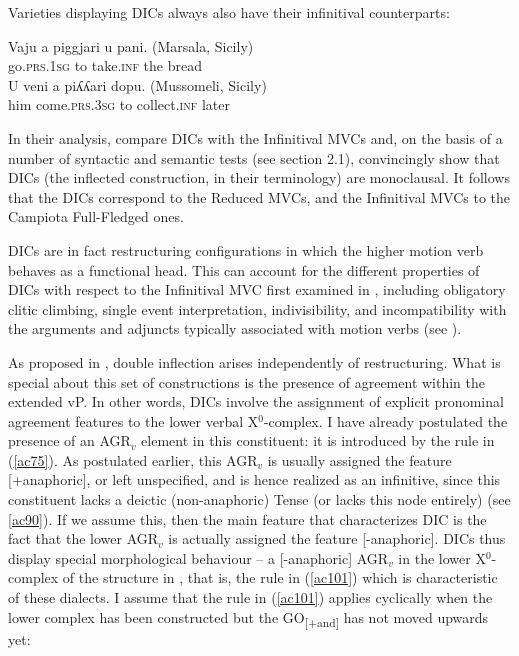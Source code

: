 \documentclass[output=paper]{langscibook}
\begin{document}
Varieties displaying DICs always also have their infinitival counterparts:

\ea \label{ac99}\gll Vaju    a  piggjari u     pani.    (Marsala, Sicily)\\
go.\textsc{prs}.\textsc{1sg} to  take.\textsc{inf} the    bread \\
\ex \label{ac100}\gll U   veni      a   piʎʎari   dopu.   (Mussomeli, Sicily)\\
him  come.\textsc{prs}.\textsc{3sg} to   collect.\textsc{inf} later\\
\z

In their analysis, \cite{cardinaletti2001a} compare DICs with the Infinitival MVCs and, on the basis of a number of syntactic and semantic tests (see section 2.1), convincingly show that DICs (the inflected construction, in their terminology) are monoclausal. It follows that the DICs correspond to the Reduced MVCs, and the Infinitival MVCs to the Campiota Full-Fledged ones.

DICs are in fact restructuring configurations in which the higher motion verb behaves as a functional head. This can account for the different properties of DICs with respect to the Infinitival MVC first examined in \cite{cardinaletti2001a}, including obligatory clitic climbing, single event interpretation, indivisibility, and incompatibility with the arguments and adjuncts typically associated with motion verbs (see \cite{cardinaletti2001a, cardinaletti2003a, manzini2005a, cruschina2013a, caro2019a}). 

As proposed in \cite{cruschina2021a}, double inflection arises independently of restructuring. What is special about this set of constructions is the presence of agreement within the extended vP. In other words, DICs involve the assignment of explicit pronominal agreement features to the lower verbal X$^0$-complex. I have already postulated the presence of an  AGR$_v$ element in this constituent: it is introduced by the rule in (\ref{ac75}).  As postulated earlier, this AGR$_v$ is usually assigned the feature [+anaphoric], or left unspecified, and is hence realized as an infinitive, since this constituent lacks a deictic (non-anaphoric) Tense (or lacks this node entirely) (see \ref{ac90}). If we assume this, then the main feature that characterizes DIC is the fact that the lower AGR$_v$ is actually assigned the feature [-anaphoric]. DICs thus display special morphological behaviour  --  a [-anaphoric] AGR$_v$ in the lower X$^0$-complex of the structure in , that is, the rule in (\ref{ac101}) which is characteristic of these dialects. I assume that the rule in (\ref{ac101}) applies cyclically when the lower complex has been constructed but the GO\textsubscript{[+and]} has not moved upwards yet:
 
\end{document}
